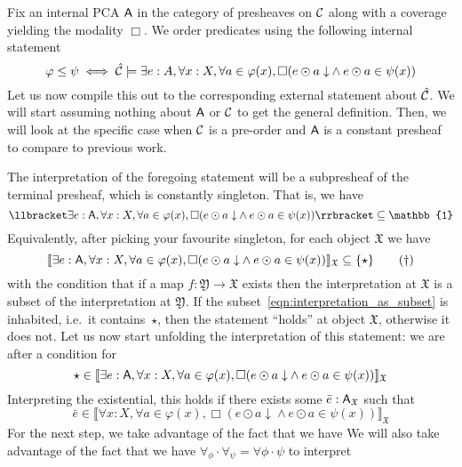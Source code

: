 \documentclass[11pt]{article}
\begin{document}
\newpage

Fix an internal PCA \(\mathsf{A}\) in the category of presheaves on \(\mathcal{C}\) along with a
coverage yielding the modality \(\Box\). We order predicates using the
following internal statement
\[
  \varphi \leq \psi
  \iff
  \hat{\mathcal{C}} \models
    \exists e : A,
    \forall x : X,
    \forall a \in \varphi(x),
    \Box ({e \odot a \downarrow} \land e \odot a \in \psi(x))
\]
Let us now compile this out to the corresponding external statement about
\(\hat{\mathcal{C}}\). We will start assuming nothing about \(\mathsf{A}\) or
\(\mathcal{C}\) to get the general definition. Then, we will look at the specific
case when \(\mathcal{C}\) is a pre-order and \(\mathsf{A}\) is a constant presheaf to compare
to previous work.

The interpretation of the foregoing statement will be a subpresheaf of
the terminal presheaf, which is constantly singleton. That is,
we have
\[
 \llbracket
    \exists e : \A,
    \forall x : X,
    \forall a \in \varphi(x),
    \Box ({e \odot a \downarrow} \land e \odot a \in \psi(x))
  \rrbracket \subseteq \mathbb{1}
\]
Equivalently, after picking your favourite singleton, for each object \(\mathfrak{X}\) we
have
\begin{equation}\label{eqn:interpretation_as_subset}
 \llbracket
    \exists e : \mathsf{A},
    \forall x : X,
    \forall a \in \varphi(x),
    \Box ({e \odot a \downarrow} \land e \odot a \in \psi(x))
  \rrbracket_{\mathfrak{X}} \subseteq \{\star\}\tag{\(\dagger\)}
\end{equation}
with the condition that if a map \(f : \mathfrak{Y} \to \mathfrak{X}\) exists
then the interpretation at \(\mathfrak{X}\) is a subset of the interpretation at
\(\mathfrak{Y}\). If the subset~\ref{eqn:interpretation_as_subset} is inhabited,
i.e.\ it contains~\(\star\), then the statement ``holds'' at object
\(\mathfrak{X}\), otherwise it does not. Let us now start unfolding the
interpretation of this statement: we are after a condition for
\[
 \star \in \llbracket
    \exists e : \mathsf{A},
    \forall x : X,
    \forall a \in \varphi(x),
    \Box ({e \odot a \downarrow} \land e \odot a \in \psi(x))
  \rrbracket_{\mathfrak{X}}
\]
Interpreting the existential, this holds if there exists some
\(\bar{e} : \mathsf{A}_{\mathfrak{X}}\) such that
\[
 \bar{e} \in \llbracket
    \forall x : X,
    \forall a \in \varphi(x),
    \Box ({e \odot a \downarrow} \land e \odot a \in \psi(x))
  \rrbracket_{\mathfrak{X}}
\]
For the next step, we take advantage of the fact that we have We will also take
advantage of the fact that we have
\(\forall_{\phi} \cdot \forall_{\psi} = \forall{\phi \cdot \psi}\) to interpret
\end{document}
